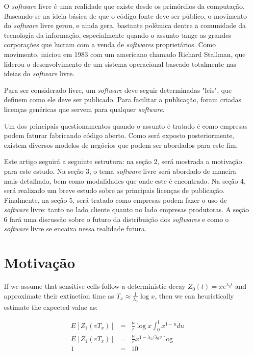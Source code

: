\documentclass{classe_cn}                 %
\begin{document}
O \textit{software} livre é uma realidade que existe desde os primórdios da computação. Baseando-se na ideia básica de que o código fonte deve ser público, o movimento do \textit{software} livre gerou, e ainda gera, bastante polêmica dentre a comunidade da tecnologia da informação, especialmente quando o assunto tange as grandes corporações que lucram com a venda de \textit{softwares} proprietários. Como movimento, iniciou em 1983 \cite{Br-linux} com um americano chamado Richard Stallman, que liderou o desenvolvimento de um sistema operacional baseado totalmente nas ideias do \textit{software} livre.

Para ser considerado livre, um \textit{software} deve seguir determinadas "leis", que definem como ele deve ser publicado. Para facilitar a publicação, foram criadas licenças genéricas que servem para qualquer \textit{software}.

Um dos principais questionamentos quando o assunto é tratado é como empresas podem faturar fabricando código aberto. Como será exposto posteriormente, existem diversos modelos de negócios que podem ser abordados para este fim.

Este artigo seguirá a seguinte estrutura: na seção 2, será mostrada a motivação para este estudo. Na seção 3, o tema \textit{software} livre será abordado de maneira mais detalhada, bem como modalidades que onde este é encontrado. Na seção 4, será realizado um breve estudo sobre as principais licenças de publicação. Finalmente, na seção 5, será tratado como empresas podem fazer o uso de \textit{software} livre: tanto no lado cliente quanto no lado empresas produtoras. A seção 6 fará uma discussão sobre o futuro da distribuição dos \textit{softwares} e como o \textit{software} livre se encaixa nessa realidade futura.


\section{Motivação}

If we assume that sensitive cells follow a deterministic decay $Z_0(t) = xe^{\lambda_0 t}$ and approximate their extinction time as $T_x \approx \frac{1}{\lambda_0} \log x$, then we can heuristically estimate the expected value as:

\begin{eqnarray}
\label{eqexpmuts}
  E [Z_1(vT_x)] &=& \frac{\mu}{r}\log x \int_0^{1} x^{1-u} du \\
  E [Z_1(vT_x)] &=& \frac{\mu}{r}x^{1-{\lambda_1}/{\lambda_0}v}\log  \\
  1 &=& 10
\end{eqnarray}
\end{document}
